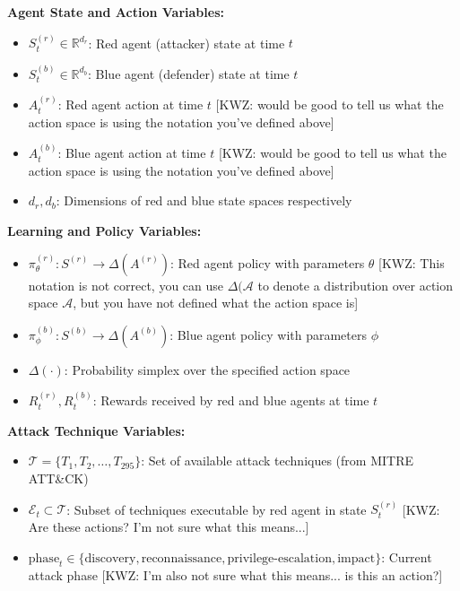 \documentclass[12pt,oneside]{article}
\newcommand{\kwz}[1]{
  {\color{magenta} [KWZ: {#1}]}
 }
\begin{document}
\textbf{Agent State and Action Variables:}
\begin{itemize}
    \item $S^{(r)}_t \in \mathbb{R}^{d_r}$: Red agent (attacker) state at time $t$
    \item $S^{(b)}_t \in \mathbb{R}^{d_b}$: Blue agent (defender) state at time $t$
    \item $A^{(r)}_t$: Red agent action at time $t$ \kwz{would be good to tell us what the action space is using the notation you've defined above}
    \item $A^{(b)}_t$: Blue agent action at time $t$ \kwz{would be good to tell us what the action space is using the notation you've defined above}
    \item $d_r, d_b$: Dimensions of red and blue state spaces respectively
\end{itemize}

\textbf{Learning and Policy Variables:}
\begin{itemize}
    \item $\pi^{(r)}_\theta: S^{(r)} \to \Delta(A^{(r)})$: Red agent policy with parameters $\theta$ \kwz{This notation is not correct, you can use $\Delta(\mathcal{A}$ to denote a distribution over action space $\mathcal{A}$, but you have not defined what the action space is}
    \item $\pi^{(b)}_\phi: S^{(b)} \to \Delta(A^{(b)})$: Blue agent policy with parameters $\phi$
    \item $\Delta(\cdot)$: Probability simplex over the specified action space
    \item $R^{(r)}_t, R^{(b)}_t$: Rewards received by red and blue agents at time $t$
\end{itemize}

\textbf{Attack Technique Variables:}
\begin{itemize}
    \item $\mathcal{T} = \{T_1, T_2, \ldots, T_{295}\}$: Set of available attack techniques (from MITRE ATT\&CK)
    \item $\mathcal{E}_t \subset \mathcal{T}$: Subset of techniques executable by red agent in state $S^{(r)}_t$ \kwz{Are these actions? I'm not sure what this means...}
    \item $\text{phase}_t \in \{\text{discovery}, \text{reconnaissance}, \text{privilege-escalation}, \text{impact}\}$: Current attack phase \kwz{I'm also not sure what this means... is this an action?}
\end{itemize}
\end{document}
